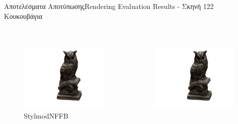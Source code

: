 \documentclass[10pt]{beamer}
\begin{document}
\begin{frame}{Αποτελέσματα Αποτύπωσης}{Rendering Evaluation Results - Σκηνή 122 Κουκουβάγια}
\begin{columns}[T]
\begin{figure}
            \end{figure}
    \end{columns}
    \begin{columns}[T]
            \begin{figure}
                \includegraphics[height=.3\textheight, width=\linewidth, keepaspectratio]{images/chapter5_img/RenderingResults/StylemodNFFB/eval_055.jpg}
                \caption{\tiny{StylmodNFFB}}
            \end{figure}
            \begin{figure}
                \includegraphics[height=.3\textheight, width=\linewidth, keepaspectratio]{images/chapter5_img/RenderingResults/MRHashGrid3DTCNN/eval_055.jpg}

\end{figure}
\end{columns}
\end{frame}
\end{document}
